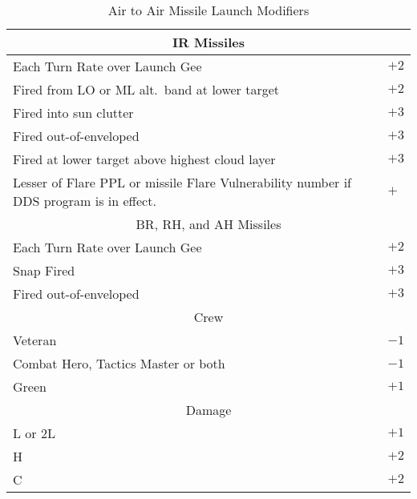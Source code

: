 \begin{table}
\centering
\caption{Air to Air Missile Launch Modifiers}
\medskip
\begin{tabular}{p{20em}l}
\hline
\multicolumn{2}{c}{IR Missiles}\\
\hline
Each Turn Rate over Launch Gee&$+2$\\
Fired from LO or ML alt.\ band at lower target&$+2$\\
Fired into sun clutter&$+3$\\
Fired out-of-enveloped&$+3$\\
Fired at lower target above highest cloud layer&$+3$\\
Lesser of Flare PPL or missile Flare Vulnerability number if DDS program is in effect.&$+$\\
\hline
\multicolumn{2}{c}{BR, RH, and AH Missiles}\\
\hline
Each Turn Rate over Launch Gee&$+2$\\
Snap Fired&$+3$\\
Fired out-of-enveloped&$+3$\\
\hline
\multicolumn{2}{c}{Crew}\\
\hline
Veteran&$-1$\\
Combat Hero, 
Tactics Master or both&$-1$\\
Green&$+1$\\
\hline
\multicolumn{2}{c}{Damage}\\
\hline
L or 2L&$+1$\\
H&$+2$\\
C&$+2$\\
\hline
\end{tabular}
\end{table}